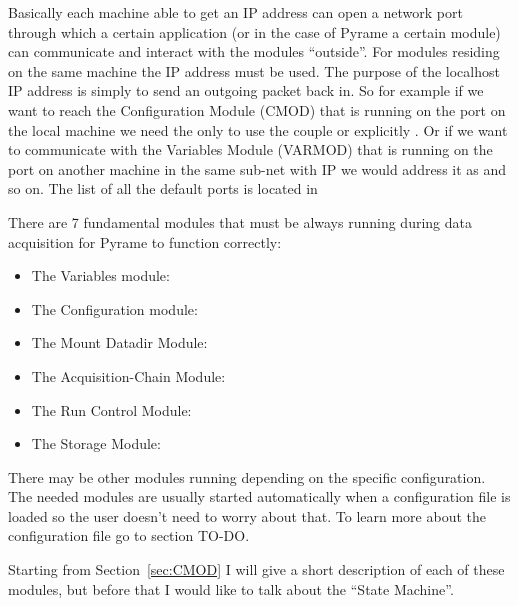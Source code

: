 Basically each machine able to get an IP address can open a network port through
which a certain application (or in the case of Pyrame a certain module) can
communicate and interact with the modules ``outside''. For modules residing on
the same machine the  IP address must be
used. The purpose of the localhost IP address is simply to send an outgoing
packet back in. So for example if we want to reach the Configuration Module
(CMOD) that is running on the port  on the local
machine we need the only to use the couple  or
explicitly . Or if we want to communicate with the
Variables Module (VARMOD) that is running on the port
 on another machine in the same sub-net with IP
 we would address it as
 and so on.  The list of all the default ports
is located in 

There are 7 fundamental modules that must be always running during data
acquisition for Pyrame to function correctly:
\begin{itemize}
\item The Variables module: 
\item The Configuration module: 
\item The Mount Datadir Module: 
\item The Acquisition-Chain Module: 
\item The Run Control Module: 
\item The Storage Module: 
\end{itemize}
There may be other modules running depending on the specific configuration. The
needed modules are usually started automatically when a configuration file is
loaded so the user doesn't need to worry about that. To learn more about the
configuration file go to section TO-DO.\@

Starting from Section~\ref{sec:CMOD} I will give a short description of each of
these modules, but before that I would like to talk about the ``State Machine''.

